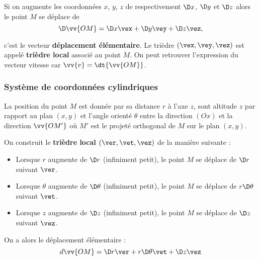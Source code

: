 \documentclass{cours}
\begin{document}
Si on augmente les coordonnées $x$, $y$, $z$ de respectivement $\D x$, $\D y$ et $\D z$ alors le point $M$ se déplace de 
\begin{equation}
\D \vv{OM} = \D x \vex +\D y \vey + \D z \vez , 
\end{equation}




c'est le vecteur \textbf{déplacement élémentaire}. Le trièdre $(\vex, \vey, \vez)$ est appelé \textbf{trièdre local} associé au point $M$. On peut retrouver l'expression du vecteur vitesse car $\vv{v} = \dt{\vv{OM}}$. 


\subsubsection{Système de coordonnées cylindriques}%
\label{ssub:systeme_de_coordonnees_cylindriques}
La position du point $M$ est donnée par sa distance $r$ à l'axe $z$, sont altitude $z$ par rapport au plan $(x, y)$ et l'angle orienté $\theta$ entre la direction $(Ox)$ et la direction $\vv{OM'}$ où $M'$ est le projeté orthogonal de $M$ sur le plan $(x, y)$.

On construit le \textbf{trièdre local} $(\ver, \vet, \vez)$ de la manière suivante :
\begin{itemize}
  \item Lorsque $r$ augmente de $\D r$ (infiniment petit), le point $M$ se déplace  de $\D r$ suivant $\ver$.   
  \item Lorsque $\theta$ augmente de $\D \theta$ (infiniment petit), le point $M$ se déplace de $r\D \theta$ suivant $\vet$.   
  \item Lorsque $z$ augmente de $\D z$ (infiniment petit), le point $M$ se déplace de $\D z$ suivant $\vez$.   
\end{itemize}

On a alors le déplacement élémentaire :
\begin{equation}
d \vv{OM} = \D r  \ver + r\D \theta \vet + \D z \vez \end{equation}
 
\end{document}
